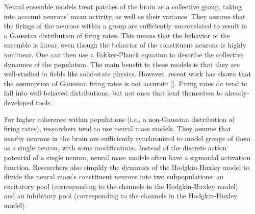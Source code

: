Neural ensemble models treat patches of the brain as a collective group, taking into account neurons' mean activity, as well as their variance.
They assume that the firings of the neurons within a group are sufficiently uncorrelated to result in a Gaussian distribution of firing rates.
This means that the behavior of the ensemble is linear, even though the behavior of the constituent neurons is highly nonlinear.
One can then use a Fokker-Planck equation to describe the collective dynamics of the population.
The main benefit to these models is that they are well-studied in fields like solid-state physics.
However, recent work has shown that the assumption of Gaussian firing rates is not accurate [].
Firing rates do tend to fall into well-behaved distributions, but not ones that lend themselves to already-developed tools.

For higher coherence within populations (i.e., a non-Gaussian distribution of firing rates), researchers tend to use neural mass models.
They assume that nearby neurons in the brain are sufficiently synchronized to model groups of them as a single neuron, with some modifications.
Instead of the discrete action potential of a single neuron, neural mass models often have a sigmoidal activation function.
Researchers also simplify the dynamics of the Hodgkin-Huxley model to divide the neural mass's constituent neurons into two subpopulations: an excitatory pool (corresponding to the  channels in the Hodgkin-Huxley model) and an inhibitory pool (corresponding to the  channels in the Hodgkin-Huxley model).

